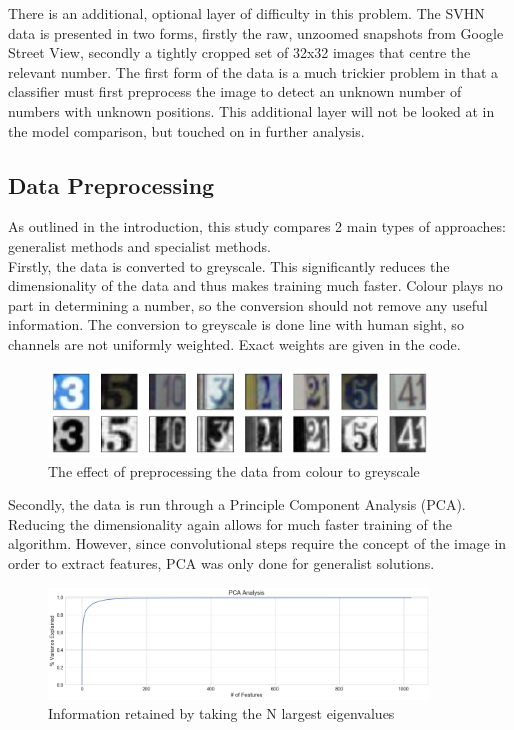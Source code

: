 \documentclass[11pt]{article}
\begin{document}
There is an additional, optional layer of difficulty in this problem. The SVHN data is presented in two forms, firstly the raw, unzoomed snapshots from Google Street View, secondly a tightly cropped set of 32x32 images that centre the relevant number. The first form of the data is a much trickier problem in that a classifier must first preprocess the image to detect an unknown number of numbers with unknown positions. This additional layer will not be looked at in the model comparison, but touched on in further analysis.

\subsection{Data Preprocessing}
As outlined in the introduction, this study compares 2 main types of approaches: generalist methods and specialist methods.\\

Firstly, the data is converted to greyscale. This significantly reduces the dimensionality of the data and thus makes training much faster. Colour plays no part in determining a number, so the conversion should not remove any useful information. The conversion to greyscale is done line with human sight, so channels are not uniformly weighted. Exact weights are given in the code.
\begin{figure}[h]
\caption{The effect of preprocessing the data from colour to greyscale}
\centering
\includegraphics[width=0.9\textwidth]{images/colour_to_greyscale.png}
\end{figure}

Secondly, the data is run through a Principle Component Analysis (PCA). Reducing the dimensionality again allows for much faster training of the algorithm. However, since convolutional steps require the concept of the image in order to extract features, PCA was only done for generalist solutions.
\begin{figure}[h]
\caption{Information retained by taking the N largest eigenvalues}
\centering
\includegraphics[width=0.9\textwidth]{images/pca_information_retention.png}
\end{figure}
\end{document}
